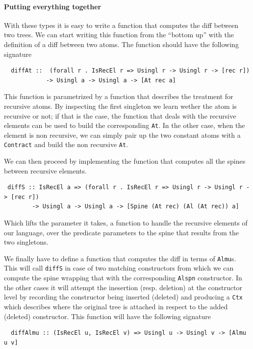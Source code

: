 \documentclass[11pt]{article}
\begin{document}
\paragraph{Putting everything together}\label{putting everything together}

With these types it is easy to write a function that computes the diff between 
two trees.
We can start writing this function from the ``bottom up'' 
with the definition of a diff between two atoms. The function should have the 
following signature
\begin{lstlisting}
  diffAt ::  (forall r . IsRecEl r => Usingl r -> Usingl r -> [rec r])
            -> Usingl a -> Usingl a -> [At rec a]
\end{lstlisting}
This function is parametrized by a function that describes the treatment for 
recursive atoms. By inspecting the first singleton we learn wether the atom is 
recursive or not; if that is the case, the function that deals with the 
recursive elements can be used to build the corresponding \texttt{At}. In the 
other case, when the element is non recursive, we can simply pair up the two 
constant atoms with a \texttt{Contract} and build the non recursive \texttt{At}.

We can then proceed by implementing the function that computes all the spines 
between recursive elements.
\begin{lstlisting}
 diffS :: IsRecEl a => (forall r . IsRecEl r => Usingl r -> Usingl r -> [rec r])
        -> Usingl a -> Usingl a -> [Spine (At rec) (Al (At rec)) a]
\end{lstlisting}
Which lifts the parameter it takes, a function to handle the 
recursive elements of our language, over the predicate parameters to the spine that results 
from the two singletons.

We finally have to define a function that computes the diff in terms of 
\texttt{Almu}s. This will call \texttt{diffS} in case of two matching constructors from which we can compute
the spine wrapping that with the corresponding \texttt{Alspn} constructor. In the other cases it will 
attempt the inesertion (resp. deletion) at the constructor level by recording the constructor being inserted
(deleted) and producing a \texttt{Ctx} which describes where the original tree is attached in respect to
the added (deleted) constructor.
This function will have the following signature

\begin{lstlisting}
  diffAlmu :: (IsRecEl u, IsRecEl v) => Usingl u -> Usingl v -> [Almu u v]
\end{lstlisting}
\end{document}
